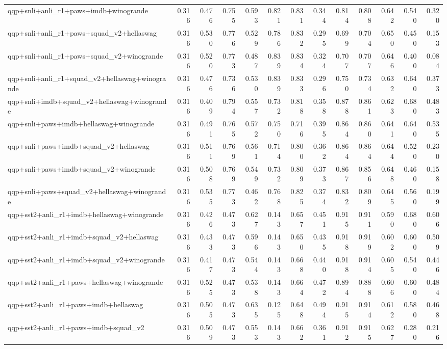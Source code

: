 \begin{table}[t]
\begin{tabular}{lrrrrrrrrrrrr}
    qqp+snli+anli\_r1+paws+imdb+winogrande & 0.316 & 0.476 & 0.755 & 0.593 & 0.821 & 0.831 & 0.344 & 0.814 & 0.808 & 0.642 & 0.540 & 0.320 \\
    qqp+snli+anli\_r1+paws+squad\_v2+hellaswag & 0.316 & 0.530 & 0.776 & 0.529 & 0.786 & 0.832 & 0.295 & 0.699 & 0.704 & 0.650 & 0.450 & 0.153 \\
    qqp+snli+anli\_r1+paws+squad\_v2+winogrande & 0.316 & 0.520 & 0.773 & 0.487 & 0.839 & 0.834 & 0.324 & 0.707 & 0.707 & 0.646 & 0.400 & 0.084 \\
    qqp+snli+anli\_r1+squad\_v2+hellaswag+winogrande & 0.316 & 0.476 & 0.736 & 0.530 & 0.839 & 0.833 & 0.296 & 0.750 & 0.734 & 0.632 & 0.640 & 0.373 \\
    qqp+snli+imdb+squad\_v2+hellaswag+winogrande & 0.316 & 0.409 & 0.794 & 0.557 & 0.732 & 0.818 & 0.358 & 0.878 & 0.861 & 0.623 & 0.680 & 0.483 \\
    qqp+snli+paws+imdb+hellaswag+winogrande & 0.316 & 0.491 & 0.765 & 0.572 & 0.750 & 0.716 & 0.395 & 0.864 & 0.860 & 0.641 & 0.640 & 0.535 \\
    qqp+snli+paws+imdb+squad\_v2+hellaswag & 0.316 & 0.511 & 0.769 & 0.561 & 0.714 & 0.800 & 0.362 & 0.864 & 0.864 & 0.644 & 0.520 & 0.230 \\
    qqp+snli+paws+imdb+squad\_v2+winogrande & 0.316 & 0.508 & 0.769 & 0.549 & 0.732 & 0.809 & 0.373 & 0.867 & 0.856 & 0.648 & 0.460 & 0.158 \\
    qqp+snli+paws+squad\_v2+hellaswag+winogrande & 0.316 & 0.535 & 0.773 & 0.462 & 0.768 & 0.825 & 0.374 & 0.832 & 0.809 & 0.645 & 0.560 & 0.199 \\
    qqp+sst2+anli\_r1+imdb+hellaswag+winogrande & 0.316 & 0.426 & 0.473 & 0.627 & 0.143 & 0.657 & 0.451 & 0.915 & 0.911 & 0.590 & 0.680 & 0.606 \\
    qqp+sst2+anli\_r1+imdb+squad\_v2+hellaswag & 0.316 & 0.433 & 0.473 & 0.596 & 0.143 & 0.650 & 0.435 & 0.918 & 0.919 & 0.602 & 0.600 & 0.509 \\
    qqp+sst2+anli\_r1+imdb+squad\_v2+winogrande & 0.316 & 0.417 & 0.473 & 0.544 & 0.143 & 0.668 & 0.440 & 0.918 & 0.914 & 0.605 & 0.540 & 0.446 \\
    qqp+sst2+anli\_r1+paws+hellaswag+winogrande & 0.316 & 0.525 & 0.473 & 0.538 & 0.143 & 0.664 & 0.472 & 0.894 & 0.888 & 0.606 & 0.600 & 0.484 \\
    qqp+sst2+anli\_r1+paws+imdb+hellaswag & 0.316 & 0.505 & 0.473 & 0.635 & 0.125 & 0.648 & 0.494 & 0.915 & 0.914 & 0.612 & 0.580 & 0.468 \\
    qqp+sst2+anli\_r1+paws+imdb+squad\_v2 & 0.316 & 0.509 & 0.473 & 0.553 & 0.143 & 0.662 & 0.361 & 0.912 & 0.915 & 0.627 & 0.280 & 0.216 \\

\end{tabular}
\end{table}
